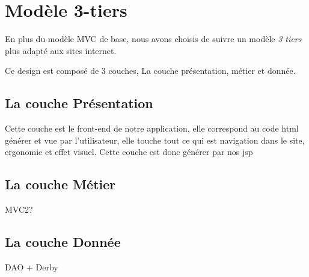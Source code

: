 \section{Modèle 3-tiers}
En plus du modèle MVC de base, nous avons choisis de suivre un modèle \emph{3 tiers} plus adapté aux sites internet.

Ce design est composé de 3 couches,
La couche présentation, métier et donnée.

\subsection{La couche Présentation}
Cette couche est le front-end de notre application, elle correspond au code html générer et vue par l'utilisateur, elle touche tout ce qui est navigation dans le site, ergonomie et effet visuel.
Cette couche est donc générer par nos jsp

\subsection{La couche Métier}
MVC2?

\subsection{La couche Donnée}
DAO + Derby
